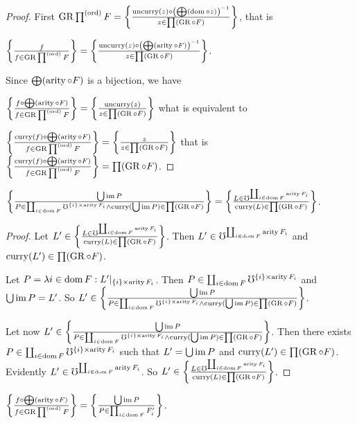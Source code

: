 \begin{proof}
First $\GR\prod^{\mathrm{(ord)}}F=\setcond{\uncurry(z)\circ\left(\bigoplus(\dom\circ z)\right)^{-1}}{z\in\prod(\GR\circ F)}$,
that is

$\setcond f{f\in\GR\prod^{\mathrm{(ord)}}F}=\setcond{\uncurry(z)\circ\left(\bigoplus(\arity\circ F)\right)^{-1}}{z\in\prod(\GR\circ F)}$.

Since $\bigoplus(\arity\circ F)$ is a bijection, we have

$\setcond{f\circ\bigoplus(\arity\circ F)}{f\in\GR\prod^{\mathrm{(ord)}}F}=\setcond{\uncurry(z)}{z\in\prod(\GR\circ F)}$
what is equivalent to

$\setcond{\curry(f)\circ\bigoplus(\arity\circ F)}{f\in\GR\prod^{\mathrm{(ord)}}F}=\setcond z{z\in\prod(\GR\circ F)}$
that is $\setcond{\curry(f)\circ\bigoplus(\arity\circ F)}{f\in\GR\prod^{\mathrm{(ord)}}F}=\prod(\GR\circ F)$.\end{proof}
\begin{lem}
$\setcond{\bigcup\im P}{P\in\coprod_{i\in\dom F}\mho^{\{i\}\times\arity F_{i}}\land\curry(\bigcup\im P)\in\prod(\GR\circ F)}=\setcond{L\in\mho^{\coprod_{i\in\dom F}\arity F_{i}}}{\curry(L)\in\prod(\GR\circ F)}$.\end{lem}
\begin{proof}
Let $L'\in\setcond{L\in\mho^{\coprod_{i\in\dom F}\arity F_{i}}}{\curry(L)\in\prod(\GR\circ F)}$.
Then $L'\in\mho^{\coprod_{i\in\dom F}\arity F_{i}}$ and $\curry(L')\in\prod(\GR\circ F)$.

Let $P=\mylambda i{\dom F}{L'|_{\{i\}\times\arity F_{i}}}$. Then
$P\in\coprod_{i\in\dom F}\mho^{\{i\}\times\arity F_{i}}$ and $\bigcup\im P=L'$.
So $L'\in\setcond{\bigcup\im P}{P\in\coprod_{i\in\dom F}\mho^{\{i\}\times\arity F_{i}}\land\curry(\bigcup\im P)\in\prod(\GR\circ F)}$.

Let now $L'\in\setcond{\bigcup\im P}{P\in\coprod_{i\in\dom F}\mho^{\{i\}\times\arity F_{i}}\land\curry(\bigcup\im P)\in\prod(\GR\circ F)}$.
Then there exists $P\in\coprod_{i\in\dom F}\mho^{\{i\}\times\arity F_{i}}$
such that $L'=\bigcup\im P$ and $\curry(L')\in\prod(\GR\circ F)$.
Evidently $L'\in\mho^{\coprod_{i\in\dom F}\arity F_{i}}$. So
$L'\in\setcond{L\in\mho^{\coprod_{i\in\dom F}\arity F_{i}}}{\curry(L)\in\prod(\GR\circ F)}$.
\end{proof}
\begin{lem}
$\setcond{f\circ\bigoplus(\arity\circ F)}{f\in\GR\prod^{\mathrm{(ord)}}F}=\setcond{\bigcup\im P}{P\in\prod_{i\in\dom F}F'_{i}}$.\end{lem}
